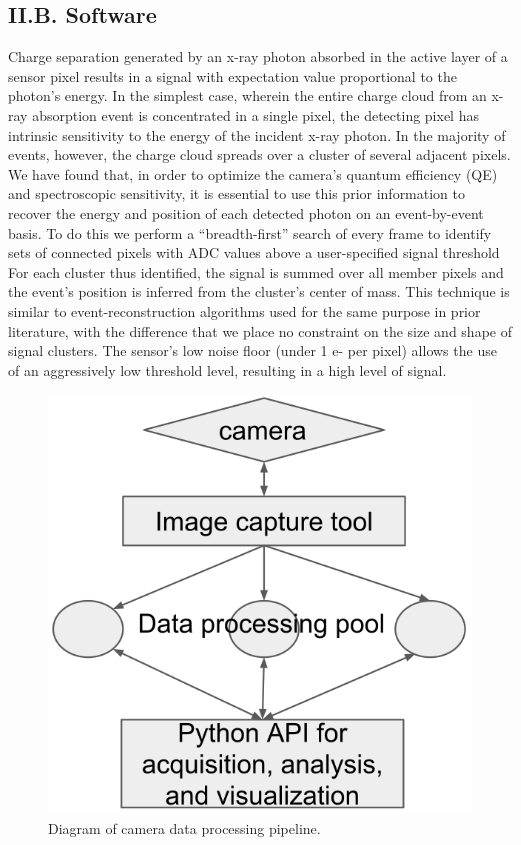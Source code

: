 \FloatBarrier

\subsection{II.B. Software}

Charge separation generated by an x-ray photon absorbed in the active
layer of a sensor pixel results in a signal with expectation value
proportional to the photon's energy. In the simplest case, wherein the
entire charge cloud from an x-ray absorption event is concentrated in a
single pixel, the detecting pixel has intrinsic sensitivity to the
energy of the incident x-ray photon. In the majority of events, however,
the charge cloud spreads over a cluster of several adjacent
pixels.\cite{hoidn2015note, holden2017compact} We have found that, in order to optimize
the camera's quantum efficiency (QE) and spectroscopic sensitivity, it
is essential to use this prior information to recover the energy and
position of each detected photon on an event-by-event basis. To do this
we perform a ``breadth-first'' search \cite{lee1961algorithm} of every frame
to identify sets of connected pixels with ADC values above a
user-specified signal threshold For each cluster thus identified, the
signal is summed over all member pixels and the event's position is
inferred from the cluster's center of mass. This technique is similar to
event-reconstruction algorithms used for the same purpose in prior
literature, with the difference that we place no constraint on the size
and shape of signal clusters.\cite{servoli2010characterization} The sensor's low noise
floor (under 1 e- per pixel) allows the use of an aggressively low
threshold level, resulting in a high level of signal.\cite{IMX291}



\begin{figure}[h] \label{cm2image2}
\caption{
Diagram of camera data processing pipeline.
}
\centering
\includegraphics[scale=0.5]{NewCameraPaper_1.10.docx1502867018/media/image2.png}
\end{figure}

